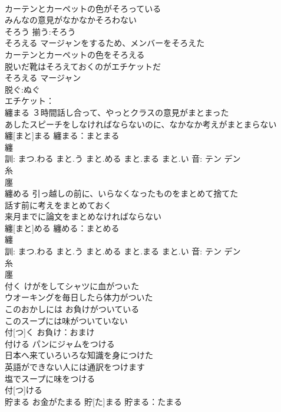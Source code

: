 \documentclass[8pt]{extreport}
\begin{document}
\begin{CJK}{UTF8}{min}
\\	カーテンとカーペットの色がそろっている 
\\	みんなの意見がなかなかそろわない 
\\	そろう			揃う:そろう
\\	そろえる	マージャンをするため、メンバーをそろえた 
\\	カーテンとカーペットの色をそろえる 
\\	脱いだ靴はそろえておくのがエチケットだ 
\\	そろえる			マージャン
\\	脱ぐ:ぬぐ
\\	エチケット：
\\	纏まる	３時間話し合って、やっとクラスの意見がまとまった 
\\	あしたスピーチをしなければならないのに、なかなか考えがまとまらない 
\\	纏[まと]まる			纏まる：まとまる
\\	纏 
\\	訓: まつ.わる まと.う まと.める まと.まる まと.い 音: テン デン 
\\	糸 
\\	廛 
\\	纏める	引っ越しの前に、いらなくなったものをまとめて捨てた 
\\	話す前に考えをまとめておく 
\\	来月までに論文をまとめなければならない 
\\	纏[まと]める			纏める：まとめる
\\	纏 
\\	訓: まつ.わる まと.う まと.める まと.まる まと.い 音: テン デン 
\\	糸 
\\	廛 
\\	付く	けがをしてシャツに血がつぃた 
\\	ウオーキングを毎日したら体力がついた 
\\	このおかしには お負けがついている 
\\	このスープには味がついていない 
\\	付[つ]く			お負け：おまけ
\\	付ける	パンにジャムをつける 
\\	日本へ来ていろいろな知識を身につけた 
\\	英語ができない人には通訳をつけます 
\\	塩でスープに味をつける 
\\	付[つ]ける						
\\	貯まる	お金がたまる	貯[た]まる			貯まる：たまる

\end{CJK}
\end{document}
